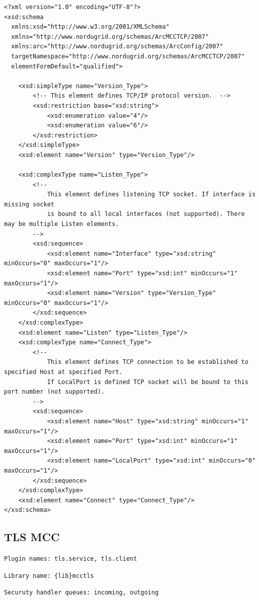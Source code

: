 \documentclass{book}
\begin{document}
\begin{verbatim}
<?xml version="1.0" encoding="UTF-8"?>
<xsd:schema
  xmlns:xsd="http://www.w3.org/2001/XMLSchema"
  xmlns="http://www.nordugrid.org/schemas/ArcMCCTCP/2007"
  xmlns:arc="http://www.nordugrid.org/schemas/ArcConfig/2007"
  targetNamespace="http://www.nordugrid.org/schemas/ArcMCCTCP/2007"
  elementFormDefault="qualified">

    <xsd:simpleType name="Version_Type">
        <!-- This element defines TCP/IP protocol version.  -->
        <xsd:restriction base="xsd:string">
            <xsd:enumeration value="4"/>
            <xsd:enumeration value="6"/>
        </xsd:restriction>
    </xsd:simpleType>
    <xsd:element name="Version" type="Version_Type"/>

    <xsd:complexType name="Listen_Type">
        <!--
            This element defines listening TCP socket. If interface is missing socket
            is bound to all local interfaces (not supported). There may be multiple Listen elements.
        -->
        <xsd:sequence>
            <xsd:element name="Interface" type="xsd:string" minOccurs="0" maxOccurs="1"/>
            <xsd:element name="Port" type="xsd:int" minOccurs="1" maxOccurs="1"/>
            <xsd:element name="Version" type="Version_Type" minOccurs="0" maxOccurs="1"/>
        </xsd:sequence>
    </xsd:complexType>
    <xsd:element name="Listen" type="Listen_Type"/>
    <xsd:complexType name="Connect_Type">
        <!--
            This element defines TCP connection to be established to specified Host at specified Port.
            If LocalPort is defined TCP socket will be bound to this port number (not supported).
        -->
        <xsd:sequence>
            <xsd:element name="Host" type="xsd:string" minOccurs="1" maxOccurs="1"/>
            <xsd:element name="Port" type="xsd:int" minOccurs="1" maxOccurs="1"/>
            <xsd:element name="LocalPort" type="xsd:int" minOccurs="0" maxOccurs="1"/>
        </xsd:sequence>
    </xsd:complexType>
    <xsd:element name="Connect" type="Connect_Type"/>
</xsd:schema>
\end{verbatim}


\subsection{TLS MCC}

\texttt{Plugin names: tls.service, tls.client}

\texttt{Library name: \{lib\}mcctls}

\texttt{Securuty handler queues: incoming, outgoing}
\end{document}
